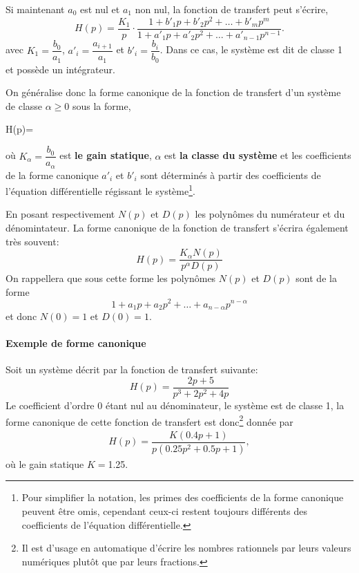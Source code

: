 Si maintenant $a_0$ est nul et $a_1$ non nul, la fonction de transfert 
peut s'écrire,
$$
H(p)=\dfrac{K_1}{p}
\cdot
\dfrac{1+b'_1p+b'_2p^2+\ldots+b'_mp^m}{1+a'_1p+a'_2p^2+\ldots+a'_{n-1}p^{n-1}}.
$$
avec $K_1=\dfrac{b_0}{a_1}$, $a'_i=\dfrac{a_{i+1}}{a_1}$ et 
$b'_i=\dfrac{b_i}{b_0}$. Dans ce cas, le système est dit de classe 1 
et possède un intégrateur.

On généralise donc la forme canonique de la fonction de transfert d'un 
système de classe $\alpha\ge0$ sous la forme, 
\begin{bequation}
H(p)=
\cdot
{} 
\label{eq-ftcan} 
\end{bequation}
où $K_\alpha=\dfrac{b_0}{a_\alpha}$ est \textbf{le gain statique}, 
$\alpha$ est \textbf{la classe du système} et les coefficients de la forme 
canonique $a'_i$ et $b'_i$ sont déterminés à partir des coefficients 
de l'équation différentielle régissant le système\footnote{Pour simplifier 
la notation, les primes des coefficients de la forme canonique peuvent 
être omis, cependant ceux-ci restent toujours différents des coefficients 
de l'équation différentielle.}.

En posant respectivement $N(p)$ et $D(p)$ les polynômes du numérateur 
et du dénomintateur. La forme canonique de la fonction de transfert 
s'écrira également très souvent:
$$
H(p)=\dfrac{K_\alpha N(p)}{p^\alpha D(p)}
$$
On rappellera que sous cette forme les polynômes $N(p)$ et $D(p)$ sont 
de la forme 
$$
1+a_1p+a_2p^2+\ldots+a_{n-\alpha}p^{n-\alpha}
$$
et donc $N(0)=1$ et $D(0)=1$.
\paragraph{Exemple de forme canonique}
Soit un système décrit par la fonction de transfert suivante:
$$
H(p)=\dfrac{2p+5}{p^3+2p^2+4p}
$$
Le coefficient d'ordre 0 étant nul au dénominateur, le système est de classe 1, 
la forme canonique de cette fonction de transfert est 
donc\footnote{Il est d'usage en automatique d'écrire les nombres rationnels 
par leurs valeurs numériques plutôt que par leurs fractions. } donnée par
\begin{align*}
H(p)=\dfrac{K(0.4p+1)}{p(0.25p^2+0.5p+1)},
\end{align*}
où le gain statique $K=$1.25.

